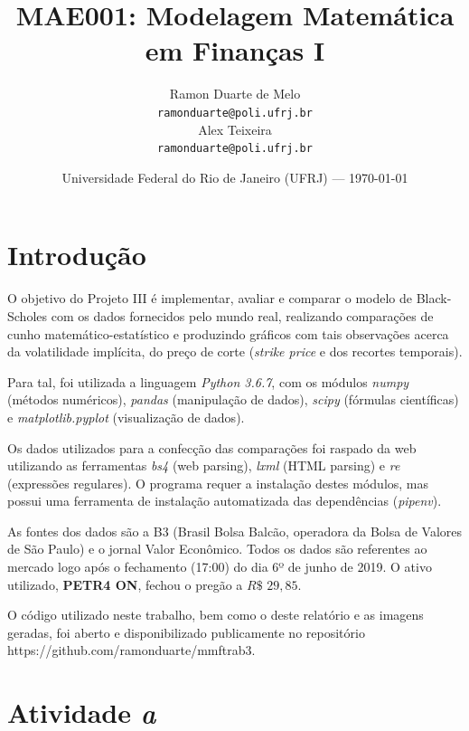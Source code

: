 \documentclass{article}
\title{MAE001: Modelagem Matemática em Finanças I} %
\author{Ramon Duarte de Melo\\ \texttt{ramonduarte@poli.ufrj.br} %
\\ Alex Teixeira\\ \texttt{ramonduarte@poli.ufrj.br}} %
\date{Universidade Federal do Rio de Janeiro (UFRJ) --- \today} %
\begin{document}
\maketitle %


\section*{Introdução} %

O objetivo do Projeto III é implementar, avaliar e comparar o modelo de Black-Scholes com os dados fornecidos pelo mundo real, realizando comparações de cunho matemático-estatístico e produzindo gráficos com tais observações acerca da volatilidade implícita, do preço de corte (\emph{strike price} e dos recortes temporais). 

Para tal, foi utilizada a linguagem \emph{Python 3.6.7}, com os módulos \emph{numpy} (métodos numéricos), \emph{pandas} (manipulação de dados), \emph{scipy} (fórmulas científicas) e \emph{matplotlib.pyplot} (visualização de dados).

Os dados utilizados para a confecção das comparações foi raspado da web utilizando as ferramentas \emph{bs4} (web parsing), \emph{lxml} (HTML parsing) e \emph{re} (expressões regulares). O programa requer a instalação destes módulos, mas possui uma ferramenta de instalação automatizada das dependências (\emph{pipenv}). 

As fontes dos dados são a B3 (Brasil Bolsa Balcão, operadora da Bolsa de Valores de São Paulo) e o jornal Valor Econômico. Todos os dados são referentes ao mercado logo após o fechamento (17:00) do dia 6º de junho de 2019. O ativo utilizado, \textbf{PETR4 ON}, fechou o pregão a $R\$ $ $29,85$.


O código utilizado neste trabalho, bem como o deste relatório e as imagens geradas, foi aberto e disponibilizado publicamente no repositório https://github.com/ramonduarte/mmftrab3.



\section*{Atividade \emph{a}} %
\end{document}
